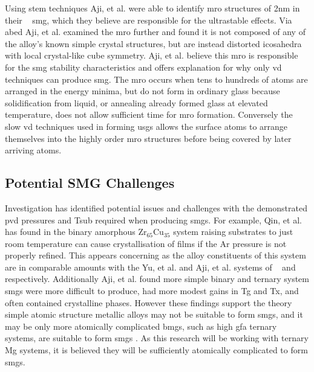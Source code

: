 \documentclass[a4paper,12pt,oneside]{report}%
\begin{document}
Using \acrshort{stem} techniques Aji, et al. \cite{Aji2013} were able to identify \gls{mro} structures of 2nm in their \ZrCuNiAl~ \gls{smg}, which they believe are responsible for the ultrastable effects. Via \gls{abed} Aji, et al. \cite{Aji2013} examined the \gls{mro} further and found it is not composed of any of the alloy's known simple crystal structures, but are instead distorted icosahedra with local crystal-like cube symmetry. Aji, et al. \cite{Aji2013} believe this \gls{mro} is responsible for the \gls{smg} stability characteristics and offers explanation for why only \gls{vd} techniques can produce \gls{smg}. The \gls{mro} occurs when tens to hundreds of atoms are arranged in the energy minima, but do not form in ordinary glass because solidification from liquid, or annealing already formed glass at elevated temperature, does not allow sufficient time for \gls{mro} formation. Conversely the slow \gls{vd} techniques used in forming \glspl{usg} allows the surface atoms to arrange themselves into the highly order \gls{mro} structures before being covered by later arriving atoms. 

\subsection{Potential SMG Challenges}
Investigation has identified potential issues and challenges with the demonstrated \gls{pvd} pressures and \gls{Tsub} required when producing \glspl{smg}. For example, Qin, et al. \cite{Qin2009} has found in the binary amorphous Zr$_{65}$Cu$_{35}$ system raising substrates to just room temperature can cause crystallisation of films if the Ar pressure is not properly refined. This appears concerning as the alloy constituents of this system are in comparable amounts with the Yu, et al. \cite{Yu2013} and Aji, et al. \cite{Aji2013} systems of \ZrCuAl~ and \ZrCuNiAl~ respectively. Additionally Aji, et al. \cite{Aji2013} found more simple binary and ternary system \glspl{smg} were more difficult to produce, had more modest gains in \gls{Tg} and \gls{Tx}, and often contained crystalline phases. However these findings support the theory simple atomic structure metallic alloys may not be suitable to form \glspl{smg}, and it may be only more atomically complicated \glspl{bmg}, such as high \gls{gfa} ternary systems, are suitable to form \glspl{smg} \cite{Yu2013}. As this research will be working with ternary Mg systems, it is believed they will be sufficiently atomically complicated to form \glspl{smg}. 
\end{document}
